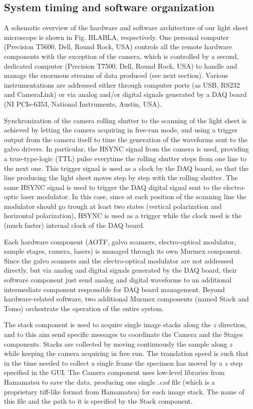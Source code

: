 \documentclass[12pt]{spieman}  %
\begin{document}
\subsection{System timing and software organization}

A schematic overview of the hardware and software architecture of our light sheet microscope is shown in Fig. BLABLA, respectively. One personal computer (Precision T5600, Dell, Round Rock, USA) controls all the remote hardware components with the exception of the camera, which is controlled by a second, dedicated computer (Precision T7500, Dell, Round Rock, USA) to handle and manage the enormous streams of data produced (see next section). Various instrumentations are addressed either through computer ports (as USB, RS232 and CameraLink) or via analog and/or digital signals generated by a DAQ board (NI PCIe-6353, National Instruments, Austin, USA).

Synchronization of the camera rolling shutter to the scanning of the light sheet is achieved by letting the camera acquiring in free-run mode, and using a trigger output from the camera itself to time the generation of the waveforms sent to the galvo drivers. In particular, the HSYNC signal from the camera is used, providing a true-type-logic (TTL) pulse everytime the rolling shutter steps from one line to the next one. This trigger signal is used as a clock by the DAQ board, so that the line producing the light sheet moves step by step with the rolling shutter. The same HSYNC signal is used to trigger the DAQ digital signal sent to the electro-optic laser modulator. In this case, since at each position of the scanning line the modulator should go trough at least two states (vertical polarization and horizontal polarization), HSYNC is used as a trigger while the clock used is the (much faster) internal clock of the DAQ board.

Each hardware component (AOTF, galvo scanners, electro-optical modulator, sample stages, camera, lasers) is managed through its own Murmex component. Since the galvo scanners and the electro-optical modulator are not addressed directly, but via analog and digital signals generated by the DAQ board, their software component just send analog and digital waveforms to an additional intermediate component responsible for DAQ board management. Beyond hardware-related software, two additional Murmex components (named Stack and Tomo) orchestrate the operation of the entire system. 

The stack component is used to acquire single image stacks along the $z$ direction, and to this aim send specific messages to coordinate the Camera and the Stages components. Stacks are collected by moving continuously the sample along $z$ while keeping the camera acquiring in free run. The translation speed is such that in the time needed to collect a single frame the specimen has moved by a $z$ step specified in the GUI. The Camera component uses low-level libraries from Hamamatsu to save the data, producing one single \emph{.cxd} file (which is a proprietary tiff-like format from Hamamatsu) for each image stack. The name of this file and the path to it is specified by the Stack component.
\end{document}
